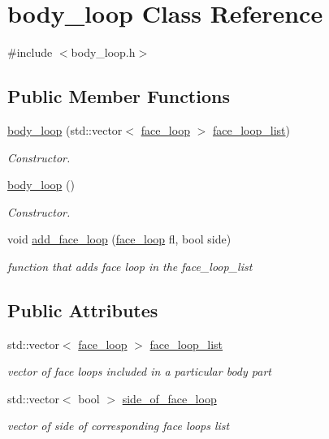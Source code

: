 \hypertarget{classbody__loop}{}\section{body\+\_\+loop Class Reference}
\label{classbody__loop}


{\ttfamily \#include $<$body\+\_\+loop.\+h$>$}

\subsection*{Public Member Functions}
\begin{DoxyCompactItemize}
\item 
\hyperlink{classbody__loop_af2f9c347cafb6dea337d5cdc1ae78394}{body\+\_\+loop} (std\+::vector$<$ \hyperlink{classface__loop}{face\+\_\+loop} $>$ \hyperlink{classbody__loop_aac59ff1c3fd827c48ad15391400600d4}{face\+\_\+loop\+\_\+list})
\begin{DoxyCompactList}\small\item\em Constructor. \end{DoxyCompactList}\item 
\hyperlink{classbody__loop_a01aca1cecd85e46978c47e1fc0aa5fca}{body\+\_\+loop} ()
\begin{DoxyCompactList}\small\item\em Constructor. \end{DoxyCompactList}\item 
void \hyperlink{classbody__loop_a979500fe24969e0a35906e515f6f2b18}{add\+\_\+face\+\_\+loop} (\hyperlink{classface__loop}{face\+\_\+loop} fl, bool side)
\begin{DoxyCompactList}\small\item\em function that adds face loop in the face\+\_\+loop\+\_\+list \end{DoxyCompactList}\end{DoxyCompactItemize}
\subsection*{Public Attributes}
\begin{DoxyCompactItemize}
\item 
std\+::vector$<$ \hyperlink{classface__loop}{face\+\_\+loop} $>$ \hyperlink{classbody__loop_aac59ff1c3fd827c48ad15391400600d4}{face\+\_\+loop\+\_\+list}
\begin{DoxyCompactList}\small\item\em vector of face loops included in a particular body part \end{DoxyCompactList}\item 
std\+::vector$<$ bool $>$ \hyperlink{classbody__loop_aa4e8adf7cebc6dc08ff335b71b0b6fa0}{side\+\_\+of\+\_\+face\+\_\+loop}
\begin{DoxyCompactList}\small\item\em vector of side of corresponding face loops list \end{DoxyCompactList}\end{DoxyCompactItemize}


